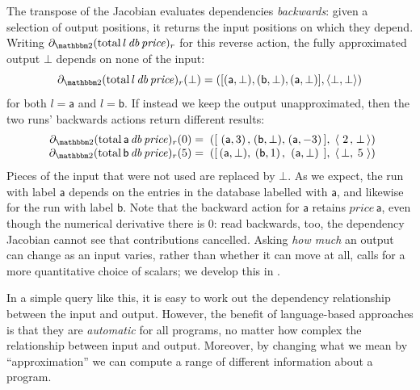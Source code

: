 \begin{example}
  The transpose of the Jacobian evaluates dependencies \emph{backwards}: given a selection of
  output positions, it returns the input positions on which they depend. Writing
  $\partial_{\Two}(\mathrm{total}\,l\,\mathit{db}\,\mathit{price})_r$ for this reverse action, the fully
  approximated output $\bot$ depends on none of the input:
  \begin{displaymath}
    \partial_{\Two} (\mathrm{total}\,l\,\mathit{db}\,\mathit{price})_r(\bot) =
    ([(\mathsf{a},\bot), (\mathsf{b}, \bot), (\mathsf{a}, \bot)], \langle \bot, \bot \rangle)
  \end{displaymath}
  for both $l = \mathsf{a}$ and $l = \mathsf{b}$. If instead we keep the output unapproximated, then the two
  runs' backwards actions return different results:
  \begin{displaymath}
    \begin{array}{r@{\;=\;([\,}c@{,\;}c@{,\;}c@{\,],\;\langle\,}c@{,\;}c@{\,\rangle)}}
      \partial_{\Two} (\mathrm{total}\,\mathsf{a}\,\mathit{db}\,\mathit{price})_r(0)
        & (\mathsf{a},3) & (\mathsf{b},\bot) & (\mathsf{a},-3) & 2 & \bot \\
      \partial_{\Two} (\mathrm{total}\,\mathsf{b}\,\mathit{db}\,\mathit{price})_r(5)
        & (\mathsf{a},\bot) & (\mathsf{b},1) & (\mathsf{a},\bot) & \bot & 5
    \end{array}
  \end{displaymath}
  Pieces of the input that were not used are replaced by $\bot$. As we expect, the run with label $\mathsf{a}$
  depends on the entries in the database labelled with $\mathsf{a}$, and likewise for the run with label
  $\mathsf{b}$. Note that the backward action for $\mathsf{a}$ retains $\mathit{price}\,\mathsf{a}$, even
  though the numerical derivative there is $0$: read backwards, too, the dependency Jacobian cannot see that
  contributions cancelled. Asking \emph{how much} an output can change as an input varies, rather than whether
  it can move at all, calls for a more quantitative choice of scalars; we develop this in
  .

\end{example}

In a simple query like this, it is easy to work out the dependency relationship between the input and output.
However, the benefit of language-based approaches is that they are {\em automatic} for all programs, no
matter how complex the relationship between input and output. Moreover, by changing what we mean by
``approximation'' we can compute a range of different information about a program.

